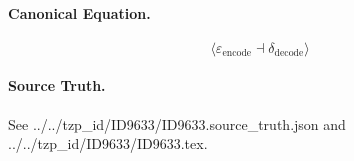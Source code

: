 \paragraph{Canonical Equation.}
\[
\langle \varepsilon_{\text{encode}} \dashv \delta_{\text{decode}} \rangle
\]

\paragraph{Source Truth.}
See ../../tzp\_id/ID9633/ID9633.source\_truth.json and ../../tzp\_id/ID9633/ID9633.tex.
